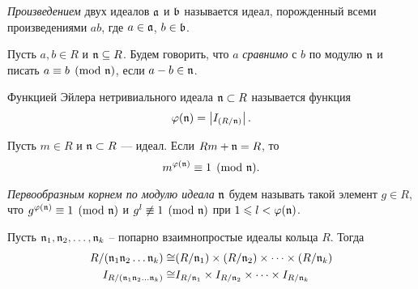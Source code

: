 \documentclass[_00_dissertation.tex]{subfiles}
\begin{document}
\begin{definition}
    \emph{Произведением} двух идеалов $\mathfrak{a}$ и $\mathfrak{b}$ называется идеал, порожденный всеми произведениями $ab$, где $a \in \mathfrak{a}$, $b \in \mathfrak{b}$.
\end{definition}

\begin{definition}
    Пусть $a, b \in R$ и $\mathfrak{n} \subseteq R$.
    Будем говорить, что $a$ \emph{сравнимо} с $b$ по модулю $\mathfrak{n}$ и писать $a \equiv b \pmod{\mathfrak{n}}$, если $a - b \in \mathfrak{n}$.
\end{definition}

\begin{definition}\cite{source:Petukhova}
    Функцией Эйлера нетривиального идеала $\mathfrak{n} \subset R$ называется функция
    \begin{equation*}
        \varphi(\mathfrak{n}) = \left|
            I_{(R/\mathfrak{n})}
        \right|.
    \end{equation*}
\end{definition}

\begin{statement}\cite{source:Petukhova}\label{statement:euler_function}
    Пусть $m \in R$ и $\mathfrak{n} \subset R$ --- идеал.
    Если $Rm + \mathfrak{n} = R$, то
    \begin{equation*}
        m^{\varphi(\mathfrak{n})}\equiv 1 \pmod{\mathfrak{n}}.
    \end{equation*}
\end{statement}

\begin{definition}
    \emph{Первообразным корнем по модулю идеала} $\mathfrak{n}$ будем называть такой элемент $g \in R$, что $g^{\varphi (\mathfrak{n})} \equiv 1 \pmod{\mathfrak{n}}$ и $g^{l} \not\equiv 1 \pmod{\mathfrak{n}}$ при $1 \leqslant l < \varphi(\mathfrak{n})$.
\end{definition}

\begin{statement}\label{statement:chinese_remainder_theorem}
    Пусть $\mathfrak{n}_1, \mathfrak{n}_2, \dots, \mathfrak{n}_k$ -- попарно взаимнопростые идеалы кольца $R$.
    Тогда
    \begin{equation*}
        \begin{split}
            R/(\mathfrak{n}_1\mathfrak{n}_2\dots\mathfrak{n}_k) \cong & (R/\mathfrak{n}_1) \times (R/\mathfrak{n}_2) \times \dots \times (R/\mathfrak{n}_k)\\
            I_{R/(\mathfrak{n}_1\mathfrak{n}_2\dots\mathfrak{n}_k)} \cong & I_{R/\mathfrak{n}_1} \times I_{R/\mathfrak{n}_2} \times \dots \times I_{R/\mathfrak{n}_k}
        \end{split}
    \end{equation*}
\end{statement}
\end{document}
